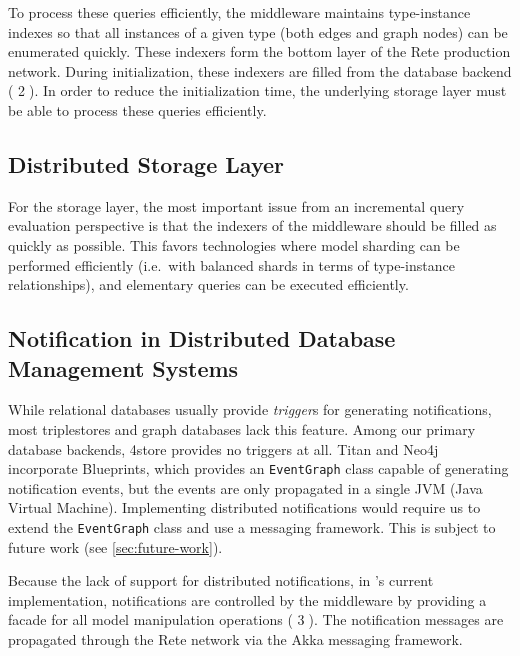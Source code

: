 To process these queries efficiently, the \iqd{} middleware maintains type-instance indexes so that all instances of a given type (both edges and graph nodes) can be enumerated quickly. These indexers form the bottom layer of the Rete production network. During initialization, these indexers are filled from the database backend ( \textcircled{2}). In order to reduce the initialization time, the underlying storage layer must be able to process these queries efficiently. 



\subsection{Distributed Storage Layer}
\label{storage}

For the storage layer, the most important issue from an incremental query evaluation perspective is that the indexers of the middleware should be filled as quickly as possible. This favors technologies where model sharding can be performed efficiently (i.e.\ with balanced shards in terms of type-instance relationships), and elementary queries 
can be executed efficiently.


\subsection{Notification in Distributed Database Management Systems}

While relational databases usually provide \emph{trigger}s for generating notifications, most triplestores and graph databases lack this feature. Among our primary database backends, 4store provides no triggers at all. Titan and Neo4j incorporate Blueprints, which provides an \texttt{EventGraph} class capable of generating notification events, but the events are only propagated in a single JVM (Java Virtual Machine). Implementing distributed notifications would require us to extend the \texttt{EventGraph} class and use a messaging framework. This is subject to future work (see \autoref{sec:future-work}). 

Because the lack of support for distributed notifications, in \iqd{}'s current implementation, notifications are controlled by the middleware by providing a facade for all model manipulation operations ( \textcircled{3}). The notification messages are propagated through the Rete network via the Akka messaging framework. 

